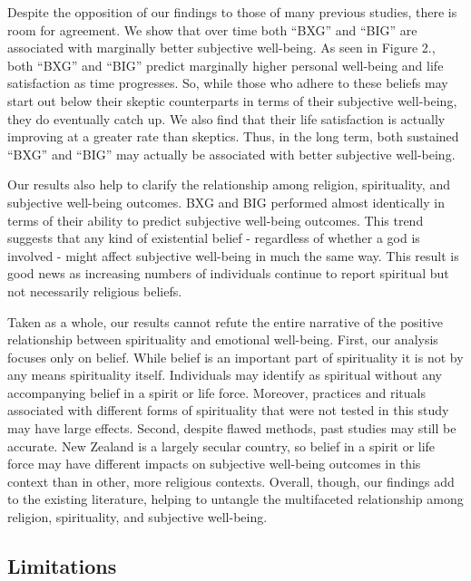 \documentclass[
  english,
  man]{apa6}
\begin{document}
Despite the opposition of our findings to those of many previous studies, there is room for agreement. We show that over time both \enquote{BXG} and \enquote{BIG} are associated with marginally better subjective well-being. As seen in Figure 2., both \enquote{BXG} and \enquote{BIG} predict marginally higher personal well-being and life satisfaction as time progresses. So, while those who adhere to these beliefs may start out below their skeptic counterparts in terms of their subjective well-being, they do eventually catch up. We also find that their life satisfaction is actually improving at a greater rate than skeptics. Thus, in the long term, both sustained \enquote{BXG} and \enquote{BIG} may actually be associated with better subjective well-being.

Our results also help to clarify the relationship among religion, spirituality, and subjective well-being outcomes. BXG and BIG performed almost identically in terms of their ability to predict subjective well-being outcomes. This trend suggests that any kind of existential belief - regardless of whether a god is involved - might affect subjective well-being in much the same way. This result is good news as increasing numbers of individuals continue to report spiritual but not necessarily religious beliefs.

Taken as a whole, our results cannot refute the entire narrative of the positive relationship between spirituality and emotional well-being. First, our analysis focuses only on belief. While belief is an important part of spirituality it is not by any means spirituality itself. Individuals may identify as spiritual without any accompanying belief in a spirit or life force. Moreover, practices and rituals associated with different forms of spirituality that were not tested in this study may have large effects. Second, despite flawed methods, past studies may still be accurate. New Zealand is a largely secular country, so belief in a spirit or life force may have different impacts on subjective well-being outcomes in this context than in other, more religious contexts. Overall, though, our findings add to the existing literature, helping to untangle the multifaceted relationship among religion, spirituality, and subjective well-being.

\hypertarget{limitations}{%
\subsection{Limitations}\label{limitations}}
\end{document}
